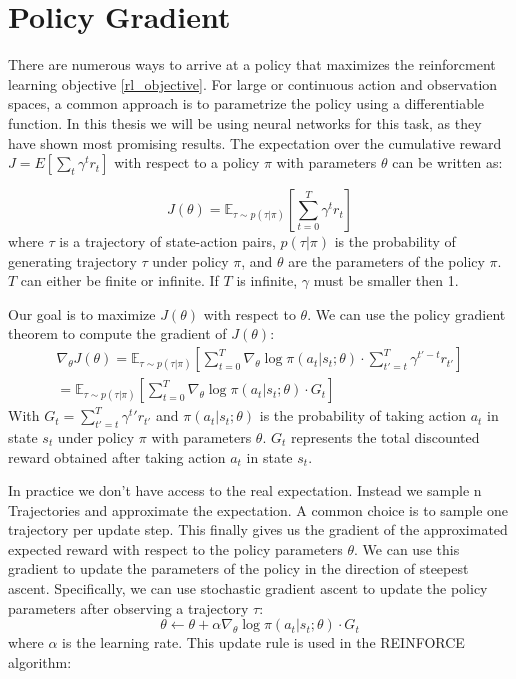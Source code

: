 \section{Policy Gradient}
There are numerous ways to arrive at a policy that maximizes the reinforcment learning objective \ref{rl_objective}. For large or continuous action and observation spaces, a common approach is 
to parametrize the policy using a differentiable function. In this thesis we will be using neural networks for this task, as they have shown most promising results. The expectation over the cumulative 
reward $J = E[\sum_{t} \gamma^t r_t]$ with respect to a policy $\pi$ with parameters $\theta$ can be written as:

\begin{equation}
J(\theta) = \mathbb{E}_{\tau \sim p(\tau | \pi)} \left[ \sum_{t=0}^T \gamma^t r_t \right]
\end{equation}
where $\tau$ is a trajectory of state-action pairs, $p(\tau | \pi)$ is the probability of generating trajectory $\tau$ under policy $\pi$, and $\theta$ are the parameters of the policy $\pi$. 
$T$ can either be finite or infinite. If $T$ is infinite, $\gamma$ must be smaller then 1.

Our goal is to maximize $J(\theta)$ with respect to $\theta$. We can use the policy gradient theorem to compute the gradient of $J(\theta)$:
\begin{equation}
    \label{nabla_reinforce}
    \begin{aligned}
        \nabla_{\theta} J(\theta) = \mathbb{E}_{\tau \sim p(\tau | \pi)} \left[ \sum_{t=0}^T \nabla_{\theta} \log \pi(a_t|s_t;\theta) \cdot \sum_{t'=t}^T \gamma^{t'-t} r_{t'} \right]\\
        = \mathbb{E}_{\tau \sim p(\tau | \pi)} \left[ \sum_{t=0}^T \nabla_{\theta} \log \pi(a_t|s_t;\theta) \cdot  G_t\right]
    \end{aligned}
\end{equation}
With $G_t = \sum_{t'=t}^T \gamma^t' r_{t'}$ and $\pi(a_t|s_t;\theta)$ is the probability of taking action $a_t$ in state $s_t$ under policy $\pi$ with parameters $\theta$. 
$G_t$ represents the total discounted reward obtained after taking action $a_t$ in state $s_t$.

In practice we don't have access to the real expectation. Instead we sample n Trajectories and approximate the expectation.
A common choice is to sample one trajectory per update step. 
This finally gives us the gradient of the approximated expected reward with respect to the policy parameters $\theta$. We can use this gradient to update the parameters of the policy in the direction of steepest ascent. Specifically, we can use stochastic gradient ascent to update the policy parameters after observing a trajectory $\tau$:
\begin{equation}
    \label{reinf_update}
    \theta \leftarrow \theta + \alpha \nabla_{\theta} \log \pi(a_t|s_t;\theta) \cdot G_t
\end{equation}
where $\alpha$ is the learning rate. This update rule is used in the REINFORCE algorithm:

